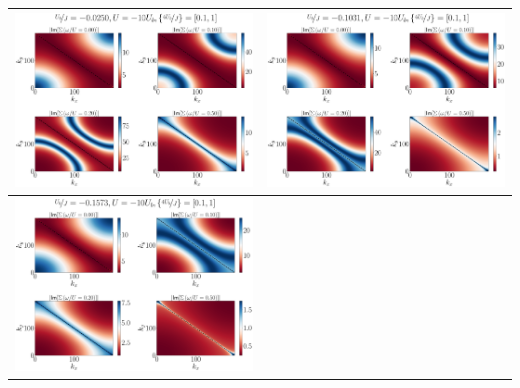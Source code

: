 \documentclass{report}
\numberwithin{equation}{section}
\begin{document}
\begin{center}
\begin{tabular}{c|c}
\includegraphics[height=0.3\textheight]{../figures/sigma-4-Ub_by_J=-0.02500-4.pdf} &
\includegraphics[height=0.3\textheight]{../figures/sigma-4-Ub_by_J=-0.10310-4.pdf}\\
\hline
\includegraphics[height=0.3\textheight]{../figures/sigma-4-Ub_by_J=-0.15735-4.pdf} &

\end{tabular}
\end{center}
\end{document}

